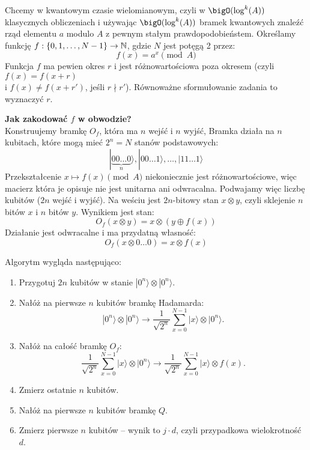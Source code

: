 Chcemy w kwantowym czasie wielomianowym, czyli w \( \bigO(\log^k(A)) \) klasycznych obliczeniach i używając \( \bigO(\log^k(A)) \) bramek kwantowych znaleźć rząd elementu \( a \) modulo \( A \) z pewnym stałym prawdopodobieństem.
Określamy funkcję \( f : \set{0, 1, \ldots, N - 1} \to \natural \), gdzie \( N \) jest potęgą 2 przez:
\[
    f(x) = a^x \pmod{A}
\]
Funkcja \( f \) ma pewien okres \( r \) i jest różnowartościowa poza okresem (czyli \( f(x) = f(x + r) \) \\ i \( f(x) \neq f(x + r') \), jeśli \( r \nmid r' \)).
Równoważne sformułowanie zadania to wyznaczyć \( r \).

\textbf{Jak zakodować \( f \) w obwodzie?} \\
Konstruujemy bramkę \( O_f \), która ma \( n \) wejść i \( n \) wyjść, Bramka działa na \( n \) kubitach, które mogą mieć \( 2^n = N \) stanów podstawowych:
\[
    |\underbrace{00\ldots0}_n\rangle, |00\ldots1\rangle, \ldots, |11\ldots1\rangle
\]
Przekształcenie \( x \mapsto f(x) \pmod{A} \) niekoniecznie jest różnowartościowe, więc macierz która je opisuje nie jest unitarna ani odwracalna.
Podwajamy więc liczbę kubitów (\( 2n \) wejść i wyjść). Na weściu jest \( 2n \)-bitowy stan \( x \otimes y \), czyli sklejenie \( n \) bitów \( x \) i \( n \) bitów \( y \).
Wynikiem jest stan:
\[
    O_f(x \otimes y) = x \otimes (y \oplus f(x))
\]
Działanie jest odwracalne i ma przydatną własność:
\[
    O_f(x \otimes 0\ldots0) = x \otimes f(x)
\]

\newpage
Algorytm wygląda następująco:
\begin{greyframe}
    \begin{enumerate}
    \item Przygotuj \( 2n \) kubitów w stanie \( |0^n\rangle \otimes |0^n\rangle \).
    \item Nałóż na pierwsze \( n \) kubitów bramkę Hadamarda:
    \[
        |0^n\rangle \otimes |0^n\rangle \rightarrow \frac{1}{\sqrt{2^n}} \sum_{x=0}^{N-1} |x\rangle \otimes |0^n\rangle.
    \]
    \item Nałóż na całość bramkę \( O_f \):
    \[
        \frac{1}{\sqrt{2^n}} \sum_{x=0}^{N-1} |x\rangle \otimes |0^n\rangle \rightarrow \frac{1}{\sqrt{2^n}} \sum_{x=0}^{N-1} |x\rangle \otimes f(x).
    \]
    \item Zmierz ostatnie \( n \) kubitów.
    \item Nałóż na pierwsze \( n \) kubitów bramkę \( Q \).
    \item Zmierz pierwsze \( n \) kubitów -- wynik to \( j \cdot d \), czyli przypadkowa wielokrotność \( d \).
    \end{enumerate}
\end{greyframe}

